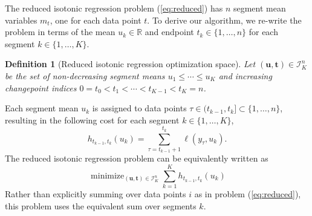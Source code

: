 \documentclass[aoas]{imsart}
\newtheorem{lemma}{Lemma}
\newtheorem{definition}{Definition}
\DeclareMathOperator*{\minimize}{minimize}
\newcommand{\RR}{\mathbb R}
\begin{document}
The reduced isotonic regression problem (\ref{eq:reduced}) has $n$
segment mean variables $m_t$, one for each data point $t$. To derive
our algorithm, we re-write the problem in terms of the mean
$u_k\in\RR$ and endpoint $t_k\in\{1,\dots,n\}$ for each
segment $k\in\{1,\dots, K\}$.
\begin{definition}[Reduced isotonic regression optimization space]
\label{def:Ibar}
  Let $(\mathbf u, \mathbf t)\in{\mathcal I}^n_K$ be the set of
  non-decreasing segment means $u_1\leq\cdots\leq u_K$ and
  increasing changepoint indices $0=t_0<t_1<\cdots<t_{K-1}<t_K=n$.
\end{definition}
Each segment mean $u_k$ is assigned to data points
$\tau\in(t_{k-1},t_k]\subset\{1,\dots,n\}$, resulting in the following
cost for each segment $k\in\{1, \dots, K\}$, 
\begin{equation}
  \label{eq:h}
  h_{t_{k-1}, t_k}(u_k) = \sum_{\tau=t_{k-1}+1}^{t_k} \ell(y_\tau, u_k).
\end{equation}
The reduced isotonic regression problem can be equivalently written as
\begin{equation}
  \label{eq:isotonic_ut}
  \minimize_{(\mathbf u, \mathbf t)\in{\mathcal I}^n_K}
  \sum_{k=1}^K
  h_{t_{k-1}, t_k}(u_k)
\end{equation}
Rather than explicitly summing over data points $i$ as in problem
(\ref{eq:reduced}), this problem uses the equivalent sum over segments $k$. 
  



\end{document}
